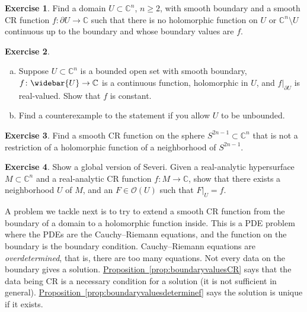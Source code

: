 \documentclass[12pt,openany]{book}
\newcommand{\C}{{\mathbb{C}}}
\newcommand{\sO}{{\mathscr{O}}}
\newcommand{\myindex}[1]{#1\index{#1}}
\theoremstyle{plain}
\theoremstyle{remark}
\theoremstyle{definition}
\newenvironment{exbox}{%
    \def\FrameCommand{\vrule width 1pt \relax\hspace{10pt}}%
    \MakeFramed{\advance\hsize-\width\FrameRestore}%
}{%
    \endMakeFramed
}
\newenvironment{exparts}{%
    \leavevmode\begin{enumerate}[a),noitemsep,topsep=0pt,parsep=0pt,partopsep=0pt]
}{%
    \end{enumerate}
}
\theoremstyle{exercise}
\newtheorem{exercise}{Exercise}[section]
\theoremstyle{example}
\newcommand{\propref}[1]{\hyperref[#1]{Proposition~\ref*{#1}}}
\begin{document}
\begin{exbox}
\begin{exercise}
Find a domain $U \subset \C^n$, $n \geq 2$, with smooth boundary and a smooth
CR function $f \colon \partial U \to \C$ such that there is no holomorphic function
on $U$ or $\C^n \setminus U$ continuous up to the boundary and whose boundary values are $f$.
\end{exercise}

\begin{exercise}
\begin{exparts}
\item
Suppose $U \subset \C^n$ is a bounded open set with smooth boundary,
$f \colon \widebar{U} \to \C$ is a continuous function, holomorphic in
$U$, and $f|_{\partial U}$ is real-valued.  Show that $f$ is
constant.
\item
Find a counterexample to the statement if you allow $U$
to be unbounded.
\end{exparts}
\end{exercise}

\begin{exercise}
Find a smooth CR function on the sphere $S^{2n-1} \subset \C^n$ that is not
a restriction of a holomorphic function of a neighborhood of $S^{2n-1}$.
\end{exercise}

\begin{exercise}
Show a global version of Severi.  Given a real-analytic hypersurface $M
\subset \C^n$ and a real-analytic CR function $f \colon M \to \C$,
show that there exists a neighborhood $U$ of $M$, and an $F \in \sO(U)$
such that $F|_U = f$.
\end{exercise}
\end{exbox}

A problem we tackle next is to try to extend
a smooth CR function from the boundary of a domain to a holomorphic
function inside.  This is a PDE problem where the PDEs are
the Cauchy--Riemann equations, and the function on the boundary is
the boundary condition.
Cauchy--Riemann equations are
\emph{\myindex{overdetermined}}, that is, there are too many
equations.  Not every data on the boundary gives a solution.
\propref{prop:boundaryvaluesCR} says that the data being CR is a necessary condition
for a solution (it is not sufficient in general).
\propref{prop:boundaryvaluesdeterminef} says the solution is unique
if it exists.

\end{document}
